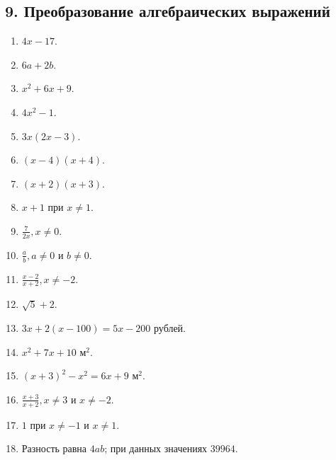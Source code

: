 \documentclass[12pt,a4paper]{article}
\theoremstyle{definition}
\theoremstyle{plain}
\theoremstyle{remark}
\newcommand{\starmark}{\ensuremath{{}^{\ast}}}
\begin{document}
\subsection*{9. Преобразование алгебраических выражений}
\begin{enumerate}[label=9.\arabic*.,leftmargin=2.8em,itemsep=5pt]
\item \(4 x - 17\).
\item \(6 a + 2 b\).
\item \(x^{2} + 6 x + 9\).
\item \(4 x^{2} - 1\).
\item \(3 x (2 x - 3)\).
\item \((x - 4) (x + 4)\).
\item \((x + 2) (x + 3)\).
\item \(x + 1\) при \(x \ne  1\).
\item \(\frac{7}{2 x},\allowbreak x \ne  0\).
\item \(\frac{a}{b},\allowbreak a \ne  0\) и \(b \ne  0\).
\item \(\frac{x - 2}{x + 2},\allowbreak x \ne  - 2\).
\item \(\sqrt{5} + 2\).
\item \(3 x + 2 (x - 100) = 5 x - 200\) рублей.
\item \(x^{2} + 7 x + 10\) м\(^{2}\).
\item \((x + 3)^{2} - x^{2} = 6 x + 9\) м\(^{2}\).
\item[\textbf{9.16.}\starmark] \(\frac{x + 3}{x + 2},\allowbreak x \ne  3\) и \(x \ne  - 2\).
\item[\textbf{9.17.}\starmark] \(1\) при \(x \ne  - 1\) и \(x \ne  1\).
\item[\textbf{9.18.}\starmark] Разность равна \(4 ab\); при данных значениях \(39964\).
\end{enumerate}
\end{document}
